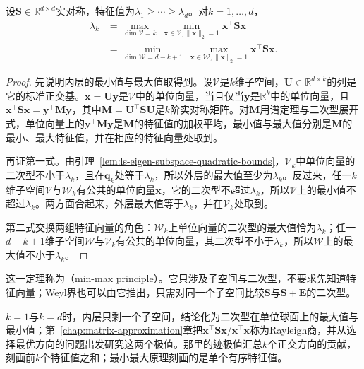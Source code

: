 \begin{theorem}
\label{thm:matrix-analysis-courant-fischer}
\label{eq:matrix-analysis-courant-fischer}
设$\bm S\in\mathbb R^{d\times d}$实对称，特征值为$\lambda_1\geq\cdots\geq\lambda_d$。对$k=1,\ldots,d$，
\begin{equation*}
\begin{aligned}
 \lambda_k
 &=\max_{\dim\mathcal V=k}\ \min_{\bm x\in\mathcal V,\lVert\bm x\rVert_2=1}\bm x^\top\bm S\bm x\\
 &=\min_{\dim\mathcal W=d-k+1}\ \max_{\bm x\in\mathcal W,\lVert\bm x\rVert_2=1}\bm x^\top\bm S\bm x .
\end{aligned}
\end{equation*}
\end{theorem}
\begin{proof}
先说明内层的最小值与最大值取得到。设$\mathcal V$是$k$维子空间，$\bm U\in\mathbb R^{d\times k}$的列是它的标准正交基。$\bm x=\bm U\bm y$是$\mathcal V$中的单位向量，当且仅当$\bm y$是$\mathbb R^k$中的单位向量，且$\bm x^\top\bm S\bm x=\bm y^\top\bm M\bm y$，其中$\bm M=\bm U^\top\bm S\bm U$是$k$阶实对称矩阵。对$\bm M$用谱定理与二次型展开式，单位向量上的$\bm y^\top\bm M\bm y$是$\bm M$的特征值的加权平均，最小值与最大值分别是$\bm M$的最小、最大特征值，并在相应的特征向量处取到。

再证第一式。由引理~\ref{lem:ls-eigen-subspace-quadratic-bounds}，$\mathcal V_k$中单位向量的二次型不小于$\lambda_k$，且在$\bm q_k$处等于$\lambda_k$，所以外层的最大值至少为$\lambda_k$。反过来，任一$k$维子空间$\mathcal V$与$\mathcal W_k$有公共的单位向量$\bm x$，它的二次型不超过$\lambda_k$，所以$\mathcal V$上的最小值不超过$\lambda_k$。两方面合起来，外层最大值等于$\lambda_k$，并在$\mathcal V_k$处取到。

第二式交换两组特征向量的角色：$\mathcal W_k$上单位向量的二次型的最大值恰为$\lambda_k$；任一$d-k+1$维子空间$\mathcal W$与$\mathcal V_k$有公共的单位向量，其二次型不小于$\lambda_k$，所以$\mathcal W$上的最大值不小于$\lambda_k$。
\end{proof}

这一定理称为（min-max principle）。它只涉及子空间与二次型，不要求先知道特征向量；Weyl界也可以由它推出，只需对同一个子空间比较$\bm S$与$\bm S+\bm E$的二次型。

$k=1$与$k=d$时，内层只剩一个子空间，结论化为二次型在单位球面上的最大值与最小值；第~\ref{chap:matrix-approximation}章把$\bm x^\top\bm S\bm x/\bm x^\top\bm x$称为Rayleigh商，并从选择最优方向的问题出发研究这两个极值。那里的迹极值汇总$k$个正交方向的贡献，刻画前$k$个特征值之和；最小最大原理刻画的是单个有序特征值。


